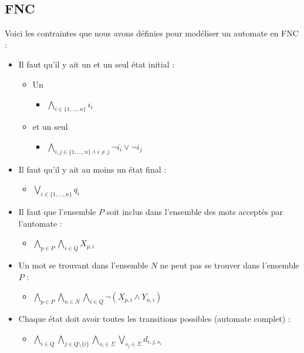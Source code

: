 \documentclass[a4paper, 12pt]{extarticle}
\begin{document}
\subsection{FNC} %
\label{sub:fnc} 

Voici les contraintes que nous avons définies pour modéliser un automate en FNC : 
\begin{itemize}[label=$\bullet$]
    \item Il faut qu'il y ait un et un seul état initial :
    \begin{itemize}[label=$\circ$]
        \item Un
            \begin{itemize}[label=$\diamond$]
                \item $\bigwedge_{i \in \{1, \dots, n\}} i_i$
            \end{itemize}
        \item et un seul
            \begin{itemize}[label=$\diamond$]
                \item $\bigwedge_{i, j \in \{1, \dots, n\} \wedge i \neq j}  \neg i_i \vee \neg i_j$
            \end{itemize} 

    \end{itemize}
    \item Il faut qu'il y ait au moins un état final : 
    \begin{itemize}[label=$\circ$]
        \item $\bigvee_{i \in \{1, \dots, n\}} q_i$
    \end{itemize}
    \item Il faut que l'ensemble $P$ soit inclus dans l'ensemble des mots acceptés par l'automate : 
    \begin{itemize}[label=$\circ$]
        \item $\bigwedge_{p \in P} \bigwedge_{i \in Q} X_{p, i}$
    \end{itemize}
    \item Un mot se trouvant dans l'ensemble $N$ ne peut pas se trouver dans l'ensemble $P$ : 
    \begin{itemize}[label=$\circ$]
        \item $\bigwedge_{p \in P} \bigwedge_{n \in N} \bigwedge_{i \in Q} \neg (X_{p, i} \wedge Y_{n, i})$
    \end{itemize} 
    \item Chaque état doit avoir toutes les transitions possibles (automate complet) : 
    \begin{itemize}[label=$\circ$]
        \item $\bigwedge_{i \in Q} \bigwedge_{j \in Q \setminus \{i\}} \bigwedge_{s_i \in \Sigma} \bigvee_{s_j \in \Sigma} d_{i, j, s_i}$ 
    \end{itemize} 
\end{itemize} 
\end{document}
